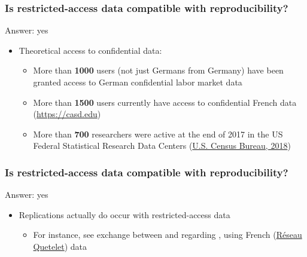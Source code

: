 \begin{frame}
\frametitle{Is restricted-access data compatible with reproducibility?}
\pause
\begin{block}{Answer: yes}
	\pause
\begin{itemize}
	\item Theoretical access to confidential  data: 
	\begin{itemize}
		\item More than \textbf{1000} users (not just Germans from Germany) have been granted access to German confidential labor market data   
		\item More than \textbf{1500} users currently have access to confidential French data (\url{https://casd.edu})
		\item More than \textbf{700} researchers were active at the end of 2017 in the US Federal Statistical Research Data Centers (\href{https://www.census.gov/ces/pdf/2017_CES_Research_Report.pdf}{U.S. Census Bureau, 2018})
	\end{itemize}
\end{itemize}
\end{block}
\end{frame}

\begin{frame}
\frametitle{Is restricted-access data compatible with reproducibility?}
\pause
\begin{block}{Answer: yes}
\begin{itemize}
		\item Replications actually do occur with restricted-access data 
		\begin{itemize}
			\item[\ ]For instance, see exchange between \textcite{Godechot2016} and \textcite{CheminWasmer2017erratum} regarding \textcite{CheminWasmer2009},  using French (\href{https://quetelet.casd.eu/fr/utilisateur/connexion}{R\'eseau Quetelet}) data 
		\end{itemize}
	\end{itemize}
\end{block}
\end{frame}



